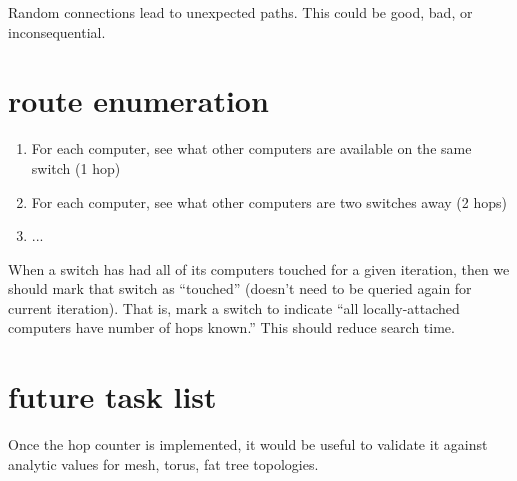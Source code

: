 \documentclass[pdftex]{article}
\begin{document}
Random connections lead to unexpected paths. This could be good, bad, or inconsequential.

\section{route enumeration}

\begin{enumerate}
 \item For each computer, see what other computers are available on the same switch (1 hop)
 \item For each computer, see what other computers are two switches away (2 hops)
 \item ...
\end{enumerate}
When a switch has had all of its computers touched for a given iteration, then we should mark that switch as ``touched'' (doesn't need to be queried again for current iteration). That is, mark a switch to indicate ``all locally-attached computers have number of hops known.'' This should reduce search time.

\section{future task list}

Once the hop counter is implemented, it would be useful to validate it against analytic values for mesh, torus, fat tree topologies.
\end{document}
